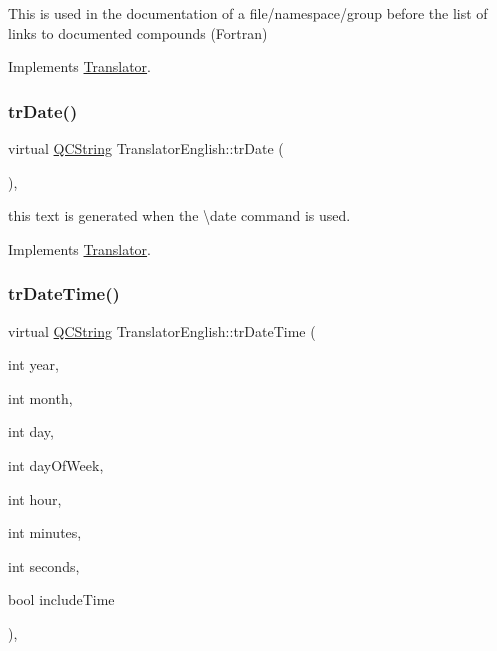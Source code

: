 This is used in the documentation of a file/namespace/group before the list of links to documented compounds (Fortran) 

Implements \mbox{\hyperlink{class_translator}{Translator}}.

\mbox{\label{class_translator_english_a65c9f77c5df0db100360e51200ae5e66}} 
\subsubsection{\texorpdfstring{trDate()}{trDate()}}
{\footnotesize\ttfamily virtual \mbox{\hyperlink{class_q_c_string}{Q\+C\+String}} Translator\+English\+::tr\+Date (\begin{DoxyParamCaption}{ }\end{DoxyParamCaption})\hspace{0.3cm}{\ttfamily [inline]}, {\ttfamily [virtual]}}

this text is generated when the \textbackslash{}date command is used. 

Implements \mbox{\hyperlink{class_translator}{Translator}}.

\mbox{\label{class_translator_english_a9241f5cd893d168d49a6152389af4644}} 
\subsubsection{\texorpdfstring{trDateTime()}{trDateTime()}}
{\footnotesize\ttfamily virtual \mbox{\hyperlink{class_q_c_string}{Q\+C\+String}} Translator\+English\+::tr\+Date\+Time (\begin{DoxyParamCaption}\item[{int}]{year,  }\item[{int}]{month,  }\item[{int}]{day,  }\item[{int}]{day\+Of\+Week,  }\item[{int}]{hour,  }\item[{int}]{minutes,  }\item[{int}]{seconds,  }\item[{bool}]{include\+Time }\end{DoxyParamCaption})\hspace{0.3cm}{\ttfamily [inline]}, {\ttfamily [virtual]}}

